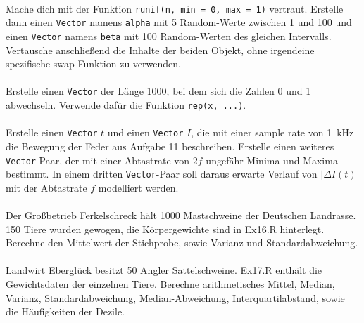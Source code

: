 \documentclass[paper=A4, pagesize, DIV=calc, smallheadings,
fontsize=12pt, expansion=false]{scrreprt}
\begin{document}
\paragraph{}
Mache dich mit der Funktion \texttt{runif(n, min = 0, max = 1)} vertraut. Erstelle dann einen \texttt{Vector} 
namens \texttt{alpha} mit 5 
Random-Werte zwischen 1 und 100 und einen \texttt{Vector} namens \texttt{beta} mit 100 Random-Werten des gleichen 
Intervalls.
Vertausche anschließend die Inhalte der beiden Objekt, ohne irgendeine spezifische swap-Funktion zu verwenden.

\paragraph{}
Erstelle einen \texttt{Vector} der Länge 1000, bei dem sich die Zahlen 0 und 1 abwechseln. Verwende dafür die Funktion 
\texttt{rep(x, ...)}.

\paragraph{}
Erstelle einen \texttt{Vector} $t$ und einen \texttt{Vector} $I$, die mit einer sample rate von \SI{1}{kHz} die 
Bewegung der Feder aus Aufgabe 11 %
beschreiben.
Erstelle einen weiteres \texttt{Vector}-Paar, der mit einer Abtastrate von $2f$ ungefähr Minima und Maxima bestimmt.
In einem dritten \texttt{Vector}-Paar soll daraus erwarte Verlauf von $|\Delta I(t)|$ mit der Abtastrate $f$ modelliert 
werden.

\paragraph{}

Der Großbetrieb Ferkelschreck hält 1000 Mastschweine der Deutschen Landrasse. 150 Tiere wurden gewogen, die 
Körpergewichte sind in Ex16.R hinterlegt. Berechne den Mittelwert der Stichprobe, sowie Varianz und 
Standardabweichung.

\paragraph{}
Landwirt Eberglück besitzt 50 Angler Sattelschweine. Ex17.R enthält die Gewichtsdaten der einzelnen Tiere. Berechne 
arithmetisches Mittel, Median, Varianz, 
Standardabweichung, Median-Abweichung, Interquartilabstand, sowie die Häufigkeiten der Dezile.
\end{document}
